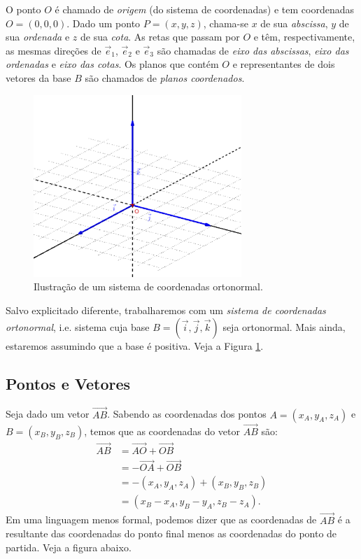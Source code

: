 O ponto $O$ é chamado de \emph{origem} (do sistema de coordenadas) e tem coordenadas $O=(0,0,0)$. Dado um ponto $P=(x,y,z)$, chama-se $x$ de sua \emph{abscissa}, $y$ de sua \emph{ordenada} e $z$ de sua \emph{cota}. As retas que passam por $O$ e têm, respectivamente, as mesmas direções de $\vec{e}_1$, $\vec{e}_2$ e $\vec{e}_3$ são chamadas de \emph{eixo das abscissas}, \emph{eixo das ordenadas} e \emph{eixo das cotas}. Os planos que contém $O$ e representantes de dois vetores da base $B$ são chamados de \emph{planos coordenados}.

\begin{figure}[H]
  \centering
  \includegraphics[width=0.7\textwidth]{./cap_estudo/dados/fig_sis_coord_orto/fig}
  \caption{Ilustração de um sistema de coordenadas ortonormal.}
  \label{fig:sis_coord_orto}
\end{figure}

Salvo explicitado diferente, trabalharemos com um \emph{sistema de coordenadas ortonormal}, i.e. sistema cuja base $B = (\vec{i},\vec{j},\vec{k})$ seja ortonormal. Mais ainda, estaremos assumindo que a base é positiva. Veja a Figura \ref{fig:sis_coord_orto}.

\subsection{Pontos e Vetores}

  
Seja dado um vetor $\overrightarrow{AB}$. Sabendo as coordenadas dos pontos $A = (x_A,y_A,z_A)$ e $B = (x_B,y_B,z_B)$, temos que as coordenadas do vetor $\overrightarrow{AB}$ são:
\begin{align}
  \overrightarrow{AB} &= \overrightarrow{AO} + \overrightarrow{OB}\\
                      &= -\overrightarrow{OA} + \overrightarrow{OB}\\
                      &= -(x_A,y_A,z_A)+(x_B,y_B,z_B)\\
                      &= (x_B-x_A,y_B-y_A,z_B-z_A).
\end{align}
Em uma linguagem menos formal, podemos dizer que as coordenadas de $\overrightarrow{AB}$ é a resultante das coordenadas do ponto final menos as coordenadas do ponto de partida. Veja a figura abaixo.

